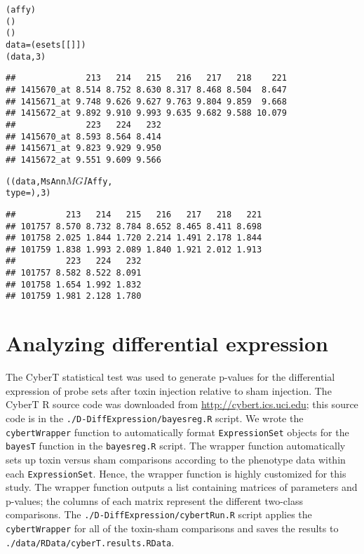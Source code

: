 \begin{knitrout}
\color{fgcolor}\begin{kframe}
\begin{alltt}
(affy)
()
()
data = (esets[[]])
(data, 3)
\end{alltt}
\begin{verbatim}
##              213   214   215   216   217   218    221
## 1415670_at 8.514 8.752 8.630 8.317 8.468 8.504  8.647
## 1415671_at 9.748 9.626 9.627 9.763 9.804 9.859  9.668
## 1415672_at 9.892 9.910 9.993 9.635 9.682 9.588 10.079
##              223   224   232
## 1415670_at 8.593 8.564 8.414
## 1415671_at 9.823 9.929 9.950
## 1415672_at 9.551 9.609 9.566
\end{verbatim}
\begin{alltt}
((data, MsAnn$MGI$Affy, \\ type = ), 3)
\end{alltt}
\begin{verbatim}
##          213   214   215   216   217   218   221
## 101757 8.570 8.732 8.784 8.652 8.465 8.411 8.698
## 101758 2.025 1.844 1.720 2.214 1.491 2.178 1.844
## 101759 1.838 1.993 2.089 1.840 1.921 2.012 1.913
##          223   224   232
## 101757 8.582 8.522 8.091
## 101758 1.654 1.992 1.832
## 101759 1.981 2.128 1.780
\end{verbatim}
\end{kframe}
\end{knitrout}


\section{Analyzing differential expression}\label{S:DE}

The CyberT statistical test \cite{Baldi:2001ul} was used to generate p-values for the
differential expression of probe sets after toxin injection relative to sham
injection. The CyberT R source code was downloaded from 
\url{http://cybert.ics.uci.edu}; this source code
is in the \texttt{./D-DiffExpression/bayesreg.R} script. We wrote the
\texttt{cybertWrapper} function to automatically format \texttt{ExpressionSet}
objects for the \texttt{bayesT} function in the \texttt{bayesreg.R} script. 
The wrapper function automatically sets up toxin versus sham comparisons according to the
phenotype data within each \texttt{ExpressionSet}. Hence, the wrapper function
is highly customized for this study. The wrapper function outputs
a list containing matrices of parameters and p-values; the columns of each
matrix represent the different two-class comparisons. The 
\texttt{./D-DiffExpression/cybertRun.R} script applies the \texttt{cybertWrapper}
for all of the toxin-sham comparisons and saves the results to 
\texttt{./data/RData/cyberT.results.RData}.


